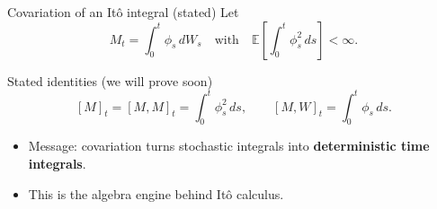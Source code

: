 \documentclass[10pt,aspectratio=169]{beamer}
\newenvironment{definitionblock}[1]{%
  \par\vspace{0.4em}%
  \begin{beamercolorbox}[
      wd=\textwidth,
      sep=0.4em,
      leftskip=0.3em,
      rightskip=0.6em,
      rounded=false,
      shadow=false
    ]{block title example}%
    \raisebox{0.15em}{\usebeamerfont{block title example}#1}%
  \end{beamercolorbox}%
  \vspace{-0.4em}%
  \begin{beamercolorbox}[
      wd=\textwidth,
      sep=1em,
      leftskip=0.6em,
      rightskip=0.6em,
      rounded=false,
      shadow=false
    ]{block body example}%
    \usebeamerfont{block body example}%
}{%
  \end{beamercolorbox}%
  \par\vspace{0.6em}%
}
\newcommand{\E}{\mathbb{E}}
\begin{document}
\begin{frame}{Covariation of an It\^o integral (stated)}
Let
\[
M_t=\int_0^t \phi_s\,dW_s
\quad\text{with}\quad
\E\!\left[\int_0^t \phi_s^2\,ds\right]<\infty.
\]\pause

\begin{block}{Stated identities (we will prove soon)}
\[
[M]_t = [M,M]_t = \int_0^t \phi_s^2\,ds,
\qquad
[M,W]_t = \int_0^t \phi_s\,ds.
\]
\end{block}\pause

\begin{itemize}
  \item Message: covariation turns stochastic integrals into \textbf{deterministic time integrals}.\pause
  \item This is the algebra engine behind It\^o calculus.
\end{itemize}
\end{frame}




\end{document}
